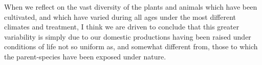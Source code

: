 When we reflect on the vast diversity of the plants and animals which have been cultivated, and which have varied during all ages under the most different climates and treatment, I think we are driven to conclude that this greater variability is simply due to our domestic productions having been raised under conditions of life not so uniform as, and somewhat different from, those to which the parent-species have been exposed under nature.\\